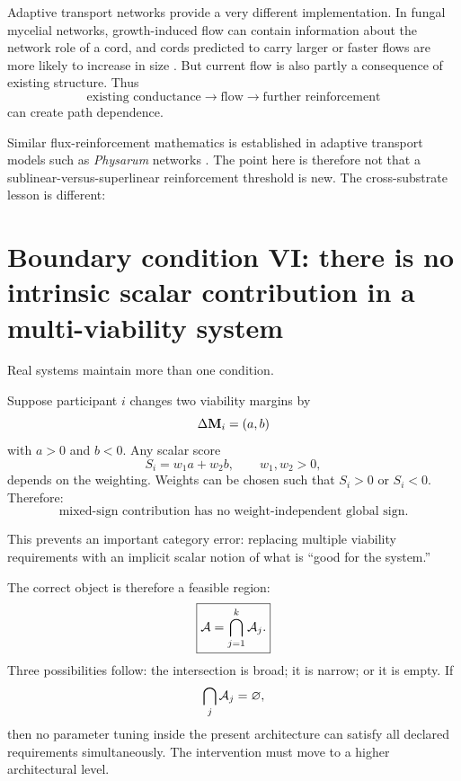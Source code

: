 Adaptive transport networks provide a very different implementation. In fungal mycelial networks, growth-induced flow can contain information about the network role of a cord, and cords predicted to carry larger or faster flows are more likely to increase in size \citep{heaton2010}. But current flow is also partly a consequence of existing structure. Thus
\[
\text{existing conductance}
\rightarrow
\text{flow}
\rightarrow
\text{further reinforcement}
\]
can create path dependence.

Similar flux-reinforcement mathematics is established in adaptive transport models such as \emph{Physarum} networks \citep{tero2007}. The point here is therefore not that a sublinear-versus-superlinear reinforcement threshold is new. The cross-substrate lesson is different:
\begin{center}
\end{center}

\section{Boundary condition VI: there is no intrinsic scalar contribution in a multi-viability system}

Real systems maintain more than one condition.

Suppose participant \(i\) changes two viability margins by
\[
\Delta\mathbf M_i=(a,b)
\]
with \(a>0\) and \(b<0\). Any scalar score
\[
S_i=w_1a+w_2b,
\qquad
w_1,w_2>0,
\]
depends on the weighting. Weights can be chosen such that \(S_i>0\) or \(S_i<0\). Therefore:
\[
\boxed{
\text{mixed-sign contribution has no weight-independent global sign.}
}
\]

This prevents an important category error: replacing multiple viability requirements with an implicit scalar notion of what is ``good for the system.''

The correct object is therefore a feasible region:
\[
\boxed{
\mathcal A
=
\bigcap_{j=1}^{k}\mathcal A_j.
}
\]
Three possibilities follow: the intersection is broad; it is narrow; or it is empty. If
\[
\bigcap_j\mathcal A_j=\varnothing,
\]
then no parameter tuning inside the present architecture can satisfy all declared requirements simultaneously. The intervention must move to a higher architectural level.
